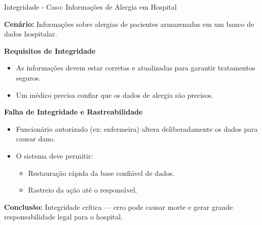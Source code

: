 \begin{frame}{Integridade - Caso: Informações de Alergia em Hospital}

\textbf{Cenário:}  
Informações sobre alergias de pacientes armazenadas em um banco de dados hospitalar.

\vspace{0.5em}
\begin{block}{\textbf{Requisitos de Integridade}}
\begin{itemize}
  \item As informações devem estar corretas e atualizadas para garantir tratamentos seguros.
  \item Um médico precisa confiar que os dados de alergia são precisos.
\end{itemize}
\end{block}

\begin{exampleblock}{\textbf{Falha de Integridade e Rastreabilidade}}
\begin{itemize}
  \item Funcionário autorizado (ex: enfermeira) altera deliberadamente os dados para causar dano.
  \item O sistema deve permitir:
    \begin{itemize}
      \item Restauração rápida da base confiável de dados.
      \item Rastreio da ação até o responsável.
    \end{itemize}
\end{itemize}
\end{exampleblock}


\textbf{Conclusão:} Integridade crítica — erro pode causar morte e gerar grande responsabilidade legal para o hospital.

\end{frame}

